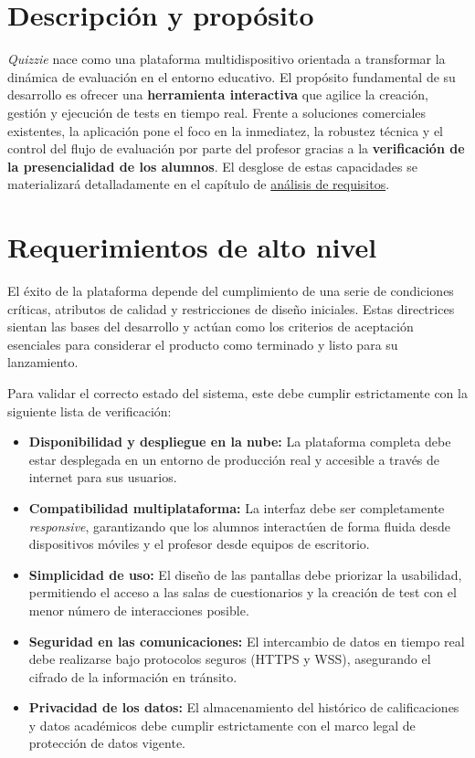 \section{Descripción y propósito}\label{sec:descripcion_y_proposito}

\textit{Quizzie} nace como una plataforma multidispositivo orientada a transformar la dinámica de evaluación en el entorno educativo. El propósito fundamental de su desarrollo es ofrecer una \textbf{herramienta interactiva} que agilice la creación, gestión y ejecución de tests en tiempo real. Frente a soluciones comerciales existentes, la aplicación pone el foco en la inmediatez, la robustez técnica y el control del flujo de evaluación por parte del profesor gracias a la \textbf{verificación de la presencialidad de los alumnos}. El desglose de estas capacidades se materializará detalladamente en el capítulo de \hyperref[cap:analisis_de_requisitos]{análisis de requisitos}.

\section{Requerimientos de alto nivel}\label{sec:requerimientos_alto_nivel}

El éxito de la plataforma depende del cumplimiento de una serie de condiciones críticas, atributos de calidad y restricciones de diseño iniciales. Estas directrices sientan las bases del desarrollo y actúan como los criterios de aceptación esenciales para considerar el producto como terminado y listo para su lanzamiento.

Para validar el correcto estado del sistema, este debe cumplir estrictamente con la siguiente lista de verificación:

\begin{itemize}
    \item \textbf{Disponibilidad y despliegue en la nube:} La plataforma completa debe estar desplegada en un entorno de producción real y accesible a través de internet para sus usuarios.
    \item \textbf{Compatibilidad multiplataforma:} La interfaz debe ser completamente \textit{responsive}, garantizando que los alumnos interactúen de forma fluida desde dispositivos móviles y el profesor desde equipos de escritorio.
    \item \textbf{Simplicidad de uso:} El diseño de las pantallas debe priorizar la usabilidad, permitiendo el acceso a las salas de cuestionarios y la creación de test con el menor número de interacciones posible.
    \item \textbf{Seguridad en las comunicaciones:} El intercambio de datos en tiempo real debe realizarse bajo protocolos seguros (HTTPS y WSS), asegurando el cifrado de la información en tránsito.
    \item \textbf{Privacidad de los datos:} El almacenamiento del histórico de calificaciones y datos académicos debe cumplir estrictamente con el marco legal de protección de datos vigente.
\end{itemize}

